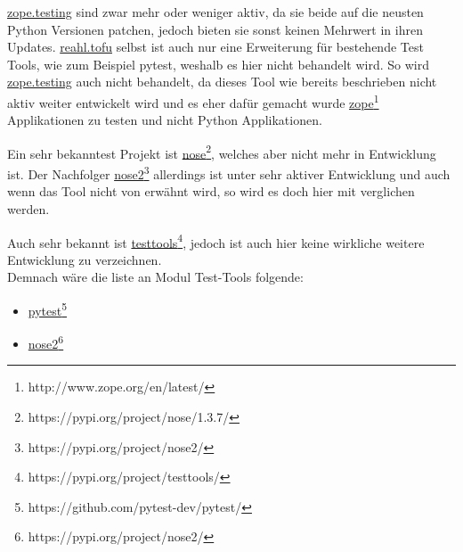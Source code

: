 \href{https://pypi.org/project/zope.testing/}{zope.testing} sind zwar mehr oder weniger aktiv, da sie
beide auf die neusten Python Versionen patchen, jedoch bieten sie sonst keinen Mehrwert in ihren Updates.
\href{https://www.reahl.org/docs/4.0/devtools/tofu.d.html}{reahl.tofu} selbst ist
auch nur eine Erweiterung für bestehende Test Tools, wie zum Beispiel pytest, weshalb es hier nicht behandelt wird. So wird
\href{https://pypi.org/project/zope.testing/}{zope.testing} auch nicht behandelt, da dieses Tool
wie bereits beschrieben nicht aktiv weiter entwickelt wird und es eher dafür gemacht wurde \href{http://www.zope.org/en/latest/}{zope}\footnote{http://www.zope.org/en/latest/}
Applikationen zu testen und nicht Python Applikationen.

Ein sehr bekanntest Projekt ist \href{https://pypi.org/project/nose/1.3.7/}{nose}\footnote{https://pypi.org/project/nose/1.3.7/}, welches aber
nicht mehr in Entwicklung ist. Der Nachfolger \href{https://pypi.org/project/nose2/}{nose2}\footnote{https://pypi.org/project/nose2/} allerdings
ist unter sehr aktiver Entwicklung und auch wenn das Tool nicht von \cite{wiki.python:PythonTestingToolsTaxonomy} erwähnt wird, so wird es doch
hier mit verglichen werden.

Auch sehr bekannt ist \href{https://pypi.org/project/testtools/}{testtools}\footnote{https://pypi.org/project/testtools/}, jedoch ist auch
hier keine wirkliche weitere Entwicklung zu verzeichnen.
\newline
\\
Demnach wäre die liste an Modul Test-Tools folgende:
\begin{itemize}
    \item \href{https://github.com/pytest-dev/pytest/}{pytest}\footnote{https://github.com/pytest-dev/pytest/}
    \item \href{https://pypi.org/project/nose2/}{nose2}\footnote{https://pypi.org/project/nose2/}
\end{itemize}


